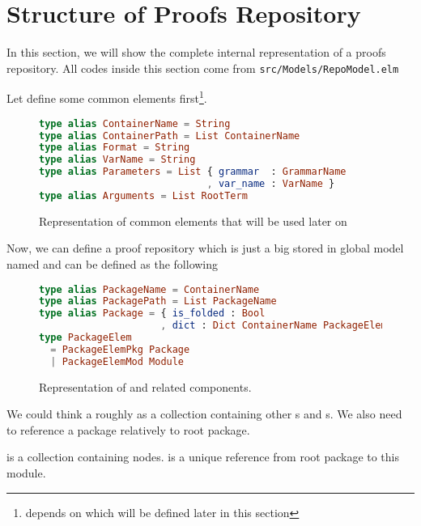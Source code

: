 \documentclass[master.tex]{subfiles}
\begin{document}
\section{Structure of Proofs Repository}
In this section, we will show the complete internal representation of a proofs
repository. All codes inside this section come from
\texttt{src/Models/RepoModel.elm}

Let define some common elements first\footnote{ depends on
   which will be defined later in this section}.

\begin{figure}[H]
\begin{framed}
\begin{lstlisting}[language=elm]
type alias ContainerName = String
type alias ContainerPath = List ContainerName
type alias Format = String
type alias VarName = String
type alias Parameters = List { grammar  : GrammarName
                             , var_name : VarName }
type alias Arguments = List RootTerm
\end{lstlisting}
\end{framed}
\caption{Representation of common elements that will be used later on}
\label{fig:implementation-repo-common}
\end{figure}

Now, we can define a proof repository which is just a big  stored
in global model named  and can be defined as the
following

\begin{figure}[H]
\begin{framed}
\begin{lstlisting}[language=elm]
type alias PackageName = ContainerName
type alias PackagePath = List PackageName
type alias Package = { is_folded : Bool
                     , dict : Dict ContainerName PackageElem }
type PackageElem
  = PackageElemPkg Package
  | PackageElemMod Module
\end{lstlisting}
\end{framed}
\caption{Representation of  and related components.}
\label{fig:implementation-repo-package}
\end{figure}

We could think a  roughly as a collection containing other
s and s. We also need  to
reference a package relatively to root package.

 is a collection containing nodes.  is a
unique reference from root package to this module.
\end{document}
